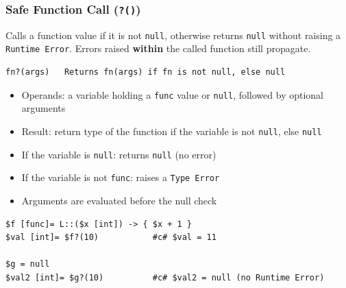 \subsubsection{Safe Function Call (\texttt{?()})}
Calls a function value if it is not \texttt{null}, otherwise returns \texttt{null} without raising a \texttt{Runtime Error}. Errors raised \textbf{within} the called function still propagate.
\begin{verbatim}
fn?(args)   Returns fn(args) if fn is not null, else null
\end{verbatim}
\begin{itemize}
\item Operands: a variable holding a \texttt{func} value or \texttt{null}, followed by optional arguments
\item Result: return type of the function if the variable is not \texttt{null}, else \texttt{null}
\item If the variable is \texttt{null}: returns \texttt{null} (no error)
\item If the variable is not \texttt{func}: raises a \texttt{Type Error}
\item Arguments are evaluated before the null check
\end{itemize}
\begin{verbatim}
$f [func]= L::($x [int]) -> { $x + 1 }
$val [int]= $f?(10)           #c# $val = 11

$g = null
$val2 [int]= $g?(10)          #c# $val2 = null (no Runtime Error)
\end{verbatim}

